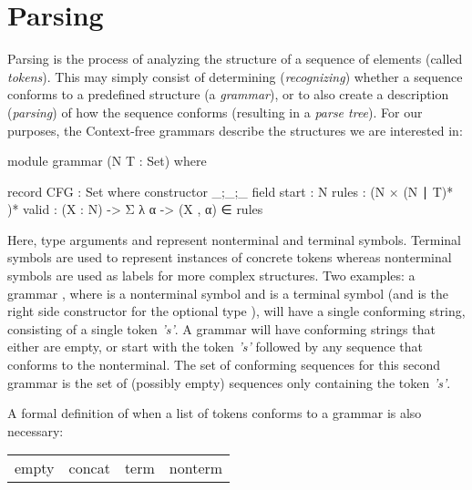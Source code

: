 \chapter{Parsing} \label{Parsing}

	Parsing is the process of analyzing the structure of a sequence of elements
	(called \emph{tokens}). This may simply consist of determining
	(\emph{recognizing}) whether a sequence conforms to a predefined structure
	(a \emph{grammar}), or to also create a description (\emph{parsing}) of how
	the sequence conforms (resulting in a \emph{parse tree}). For our
	purposes, the Context-free grammars describe the structures we are
	interested in:
	
	\begin{code}

		module grammar (N T : Set) where

		record CFG : Set where
		  constructor _;_;_
		  field
		    start : N
		    rules : (N × (N ∣ T)* )*
    		valid : (X : N) -> Σ λ α -> (X , α) ∈ rules

	\end{code}

	Here, type arguments  and  represent nonterminal and
	terminal symbols. Terminal symbols are used to represent instances of
	concrete tokens whereas nonterminal symbols are used as labels for more
	complex structures. Two examples: a grammar , where  is a nonterminal symbol and  is a
	terminal symbol (and  is the right side constructor for the
	optional type \codett{|}), will have a single conforming string, consisting
	of a single token \emph{'s'}. A grammar  will have conforming strings that either are empty, or
	start with the token \emph{'s'} followed by any sequence that conforms to
	the  nonterminal. The set of conforming sequences for this second
	grammar is the set of (possibly empty) sequences only containing the token
	\emph{'s'}.

	A formal definition of when a list of tokens conforms to a grammar is also
	necessary:

	\begin{table}[h]
		\centering
		\begin{tabular}{cccc}
			 empty & concat & term & nonterm
		\end{tabular}
	\end{table}
	

